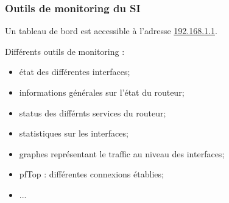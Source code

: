 \documentclass{beamer}
\begin{document}
		\begin{frame}
			\frametitle{Outils de monitoring du SI}
			Un tableau de bord est accessible à l'adresse \url{192.168.1.1}.

			Différents outils de monitoring :
			\begin{itemize}
				\item état des différentes interfaces;
				\item informations générales sur l'état du routeur;
				\item status des différnts services du routeur;
				\item statistiques sur les interfaces;
				\item graphes représentant le traffic au niveau des interfaces;
				\item pfTop : différentes connexions établies;
				\item ...
				\end{itemize}
		\end{frame}
\end{document}
